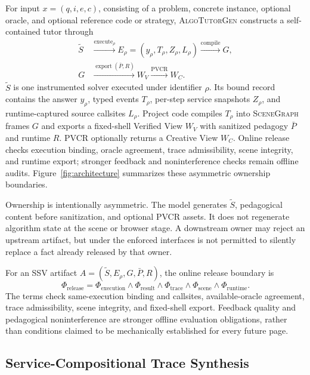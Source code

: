 \documentclass[letterpaper]{article}
\newcommand{\system}{\textsc{AlgoTutorGen}}
\newcommand{\scenegraph}{\textsc{SceneGraph}}
\newcommand{\pvcr}{\textsc{PVCR}}
\begin{document}
For input \(x=(q,i,e,c)\), consisting of a problem, concrete instance,
optional oracle, and optional reference code or strategy, \system{}
constructs a self-contained tutor through
\[
\begin{aligned}
\widetilde S
&\xrightarrow{\operatorname{execute}_{\rho}}
E_{\rho}=(y_{\rho},T_{\rho},Z_{\rho},L_{\rho})
   \xrightarrow{\operatorname{compile}} G,\\
G &\xrightarrow{\operatorname{export}(\bar{P},R)} W_V
   \xrightarrow{\operatorname{PVCR}} W_C.
\end{aligned}
\]
\(\widetilde S\) is one instrumented solver executed under identifier
\(\rho\). Its bound record contains the answer \(y_\rho\), typed events
\(T_\rho\), per-step service snapshots \(Z_\rho\), and runtime-captured
source callsites \(L_\rho\). Project code compiles \(T_\rho\) into
\scenegraph{} frames \(G\) and exports a fixed-shell Verified View
\(W_V\) with sanitized pedagogy \(\bar P\) and runtime \(R\).
\pvcr{} optionally returns a Creative View \(W_C\). Online release
checks execution binding, oracle agreement, trace admissibility, scene
integrity, and runtime export; stronger feedback and noninterference
checks remain offline audits. Figure~\ref{fig:architecture} summarizes
these asymmetric ownership boundaries.

Ownership is intentionally asymmetric. The model generates
\(\widetilde S\), pedagogical content before sanitization, and optional
\pvcr{} assets. It does not regenerate algorithm state at the scene or
browser stage. A downstream owner may reject an upstream artifact, but
under the enforced interfaces is not permitted to silently replace a
fact already released by that owner.

For an SSV artifact \(A=(\widetilde S,E_\rho,G,\bar P,R)\), the online
release boundary is
\[
\Phi_{\mathrm{release}}
=
\Phi_{\mathrm{execution}}
\land\Phi_{\mathrm{result}}
\land\Phi_{\mathrm{trace}}
\land\Phi_{\mathrm{scene}}
\land\Phi_{\mathrm{runtime}}.
\]
The terms check same-execution binding and callsites, available-oracle
agreement, trace admissibility, scene integrity, and fixed-shell export.
Feedback quality and pedagogical noninterference are stronger offline
evaluation obligations, rather than conditions claimed to be
mechanically established for every future page.

\subsection{Service-Compositional Trace Synthesis}
\label{sec:service_trace}
\end{document}

